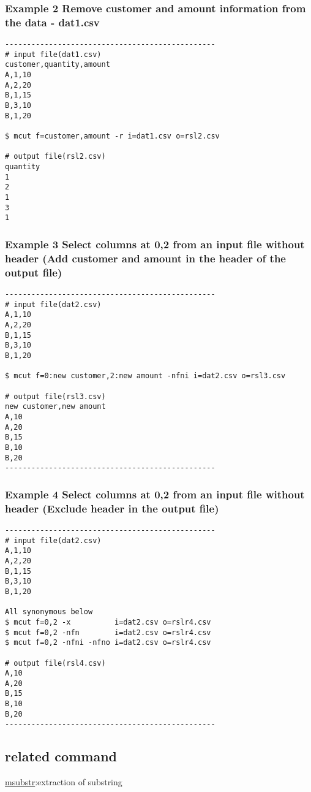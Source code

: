 \documentclass[a4paper]{jarticle}
\begin{document}
\subsubsection*{Example 2 Remove customer and amount information from the data - dat1.csv}

\begin{verbatim}
------------------------------------------------
# input file(dat1.csv)
customer,quantity,amount
A,1,10
A,2,20
B,1,15
B,3,10
B,1,20

$ mcut f=customer,amount -r i=dat1.csv o=rsl2.csv

# output file(rsl2.csv)
quantity
1
2
1
3
1
\end{verbatim}


\subsubsection*{Example 3 Select columns at 0,2 from an input file without header (Add customer and amount in the header of the output file) }

\begin{verbatim}
------------------------------------------------
# input file(dat2.csv)
A,1,10
A,2,20
B,1,15
B,3,10
B,1,20

$ mcut f=0:new customer,2:new amount -nfni i=dat2.csv o=rsl3.csv

# output file(rsl3.csv)
new customer,new amount
A,10
A,20
B,15
B,10
B,20
------------------------------------------------
\end{verbatim}

\subsubsection*{Example 4 Select columns at 0,2 from an input file without header (Exclude header in the output file)}

\begin{verbatim}
------------------------------------------------
# input file(dat2.csv)
A,1,10
A,2,20
B,1,15
B,3,10
B,1,20

All synonymous below
$ mcut f=0,2 -x          i=dat2.csv o=rslr4.csv
$ mcut f=0,2 -nfn        i=dat2.csv o=rslr4.csv
$ mcut f=0,2 -nfni -nfno i=dat2.csv o=rslr4.csv

# output file(rsl4.csv)
A,10
A,20
B,15
B,10
B,20
------------------------------------------------
\end{verbatim}

\subsection*{related command}

\href{run:msubstr.pdf}{msubstr}:extraction of substring
\end{document}
